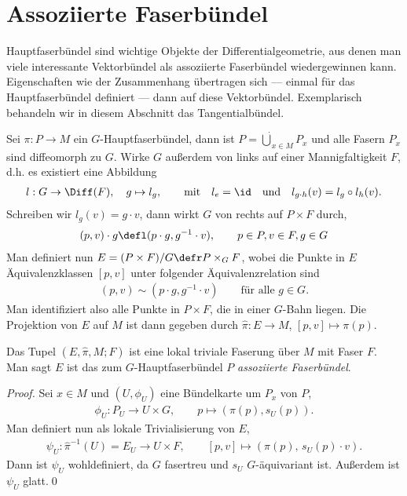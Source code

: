 \documentclass[%
	paper=a5,%
	fleqn,%
	DIV=18,%
	BCOR=0mm,
	fontsize=11pt,
	titlepage=false,%
	bibliography=totoc,
	DIV=18,%
	twoside=true,
	pdftitle=Riemannsche Geometrie,
	pdfauthor=Uwe Semmelmann,
	numbers=noendperiod]%
	{scrbook}
\begin{document}
\section{Assoziierte Faserbündel}

Hauptfaserbündel sind wichtige Objekte der Differentialgeometrie, aus denen man viele interessante
Vektorbündel als assoziierte Faserbündel wiedergewinnen kann. Eigenschaften wie
der Zusammenhang übertragen sich --- einmal für das Hauptfaserbündel definiert
--- dann auf diese Vektorbündel. Exemplarisch behandeln wir in diesem Abschnitt
das Tangentialbündel.

Sei $\pi\colon P\to M$ ein $G$-Hauptfaserbündel, dann ist $P = \dot{\bigcup}_{x\in
M} P_x$ und alle Fasern $P_x$ sind diffeomorph zu $G$.
Wirke $G$ außerdem von links auf einer Mannigfaltigkeit $F$, d.h. es existiert
eine Abbildung
\begin{align*}
l : G\to \Diff(F),\quad g\mapsto l_g,\qquad
\text{mit}\quad l_e=\id \quad\text{und}\quad l_{g\cdot h}(v) = l_g\circ l_h(v).
\end{align*}
Schreiben wir $l_g(v) = g\cdot v$, dann wirkt $G$ von rechts auf $P\times F$
durch,
\begin{align*}
(p,v)\cdot g \defl (p\cdot g, g^{-1}\cdot v),\qquad p\in P,v\in F, g\in G
\end{align*}
Man definiert nun $E=(P\times F)/G \defr P\times_G F$, wobei die Punkte in $E$
Äquivalenzklassen $[p,v]$ unter folgender Äquivalenzrelation sind
\begin{align*}
(p,v)\sim (p\cdot g,g^{-1}\cdot v)\qquad \text{für alle }g\in G.
\end{align*}
Man identifiziert also alle Punkte in $P\times F$, die in einer $G$-Bahn liegen.
Die Projektion von $E$ auf $M$ ist dann gegeben durch $\hat{\pi}\colon E\to M$,
$[p,v] \mapsto \pi(p)$.

\begin{prop}
Das Tupel $(E,\hat{\pi},M;F)$ ist eine lokal triviale Faserung über $M$ mit
Faser $F$. Man sagt $E$ ist das zum $G$-Hauptfaserbündel $P$ \emph{assoziierte
Faserbündel}.\fish
\end{prop}

\begin{proof}
Sei $x\in M$ und $(U,\phi_U)$ eine Bündelkarte um $P_x$ von $P$,
\begin{align*}
\phi_U : P_U \to U\times G,\qquad p \mapsto (\pi(p),s_U(p)). 
\end{align*}
Man definiert nun als lokale Trivialisierung von $E$,
\begin{align*}
\psi_U : \hat{\pi}^{-1}(U) = E_U \to U\times F,
\qquad [p,v] \mapsto (\pi(p),\,s_U(p)\cdot v).
\end{align*}
Dann ist $\psi_U$ wohldefiniert, da $G$ fasertreu und  $s_U$ $G$-äquivariant ist. Außerdem ist $\psi_U$ glatt.\qed
\end{proof}
\end{document}

